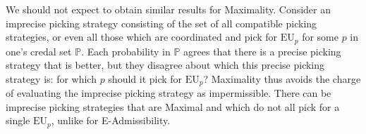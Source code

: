 \documentclass[a4paper]{article}
\renewcommand\P{\mathbb{P}} %
\newcommand\EU{\mathrm{EU}}
\newcommand{\n}{\mathsf{n}}
\newcommand{\imprecpickstrat}{\mathbb{N}}
\newcommand{\IB}{\mathbb{B}}
\newcommand{\IP}{\P}
\newenvironment{CCM rewritten}
{\begingroup\color{blue}} %
{\endgroup}              %
\begin{document}
%	
%	
%
We should not expect to obtain similar results for Maximality.
Consider an imprecise picking strategy consisting of the set of all compatible picking strategies, or even all those which are coordinated and pick for $\EU_p$ for some $p$ in one's credal set $\IP$. Each probability in $\IP$ agrees that there is a precise picking strategy that is better, but they disagree about which this precise picking strategy is: for which $p$ should it pick for $\EU_p$?
Maximality thus avoids the charge of evaluating the imprecise picking strategy as impermissible. There can be imprecise picking strategies that are Maximal and which do not all pick for a single $\EU_p$, unlike for E-Admissibility.





	
	
\end{document}
